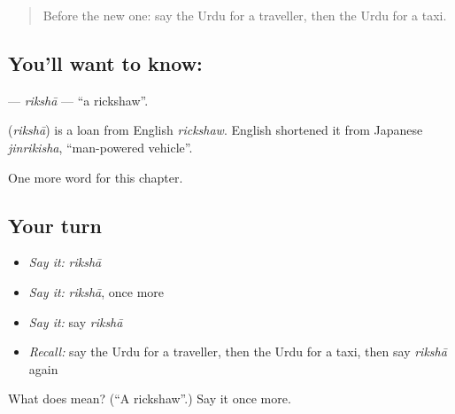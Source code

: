 \label{lesson:UR-C202-riksha}



\begin{quote}
Before the new one: say the Urdu for a traveller, then the Urdu for a taxi.
\end{quote}

\subsection*{You'll want to know: }
\textbf{} — \emph{rikshā} — \textquotedblleft{}a rickshaw\textquotedblright{}.

\begin{cousinweb}
\textbf{} (\emph{rikshā}) is a loan from English \emph{rickshaw}. English shortened it from Japanese \emph{jinrikisha}, \textquotedblleft{}man-powered vehicle\textquotedblright{}.
\end{cousinweb}

\begin{grammarlens}[title={What you've built}]
One more word for this chapter.
\end{grammarlens}

\subsection*{Your turn}
\begin{itemize}
\raggedright
  \item \emph{Say it:} \emph{rikshā}
  \item \emph{Say it:} \emph{rikshā}, once more
  \item \emph{Say it:} say \emph{rikshā}
  \item \emph{Recall:} say the Urdu for a traveller, then the Urdu for a taxi, then say \emph{rikshā} again
\end{itemize}

\begin{tcolorbox}[breakable,colback=teal!4,colframe=teal!35!black,title={Before you move on}]
What does  mean? (\textquotedblleft{}A rickshaw\textquotedblright{}.) Say it once more.
\end{tcolorbox}
